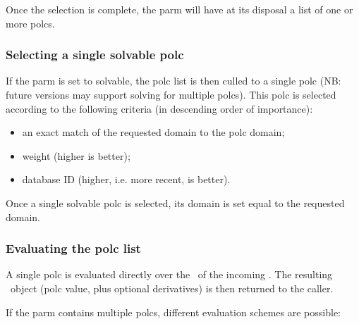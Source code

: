 \documentclass[10pt]{article}
\begin{document}
  Once the selection is complete, the parm will have at its disposal a list of
  one or more polcs. 

\subsubsection{Selecting a single solvable polc}
  
  If the parm is set to solvable, the polc list is then culled to a single polc
  (NB: future versions may support solving for multiple polcs). This polc is
  selected according to the following criteria (in descending order of
  importance):

  \begin{itemize}
  
  \item an exact match of the requested domain to the polc domain;
  
  \item weight (higher is better);
  
  \item database ID (higher, i.e. more recent, is better).
  
  \end{itemize}
  
  Once a single solvable polc is selected, its domain is set equal to the
  requested domain.
  
\subsubsection{Evaluating the polc list}

  A single polc is evaluated directly over the \Cells\ of the incoming
  \Request. The resulting \VellSet\ object (polc value, plus optional
  derivatives) is then returned to the caller. 
  
  If the parm contains multiple polcs, different evaluation schemes are
  possible:
\end{document}
